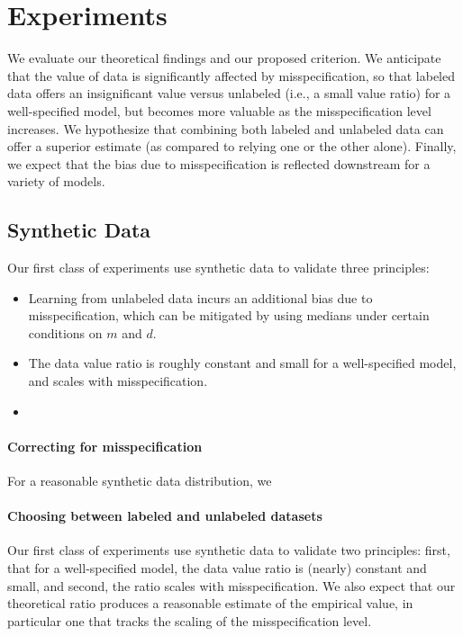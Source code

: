 \section{Experiments} \label{sec:exp}
We evaluate our theoretical findings and our proposed criterion. We anticipate that the value of data is significantly affected by misspecification, so that labeled data offers an insignificant value versus unlabeled (i.e., a small value ratio) for a well-specified model, but becomes more valuable as the misspecification level increases. We hypothesize that combining both labeled and unlabeled data can offer a superior estimate (as compared to relying one or the other alone). Finally, we expect that the bias due to misspecification is reflected downstream for a variety of models. 

\subsection{Synthetic Data}

Our first class of experiments use synthetic data to validate three principles:
\begin{itemize}
    \item Learning from unlabeled data incurs an additional bias due to misspecification, which can be mitigated by using medians under certain conditions on $m$ and $d$.
    
    \item The data value ratio is roughly constant and small for a well-specified model, and scales with misspecification.
    
    \item 
\end{itemize}

\paragraph{Correcting for misspecification} For a reasonable synthetic data distribution, we 

\paragraph{Choosing between labeled and unlabeled datasets}
Our first class of experiments use synthetic data to validate two principles: first, that for a well-specified model, the data value ratio is (nearly) constant and small, and second, the ratio scales with misspecification. We also expect that our theoretical ratio produces a reasonable estimate of the empirical value, in particular one that tracks the scaling of the misspecification level. 

